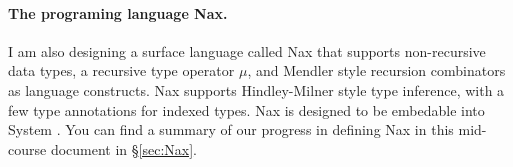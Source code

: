 \paragraph{The programing language Nax.}
I am also designing a surface language called Nax that supports
non-recursive data types, a recursive type operator $\mu$, and
Mendler style recursion combinators as language constructs.
Nax supports Hindley-Milner style type inference, with a few type annotations
for indexed types. Nax is designed to be embedable into System \Fi. 
You can find a summary of our progress in defining Nax in this mid-course document in \S\ref{sec:Nax}.

